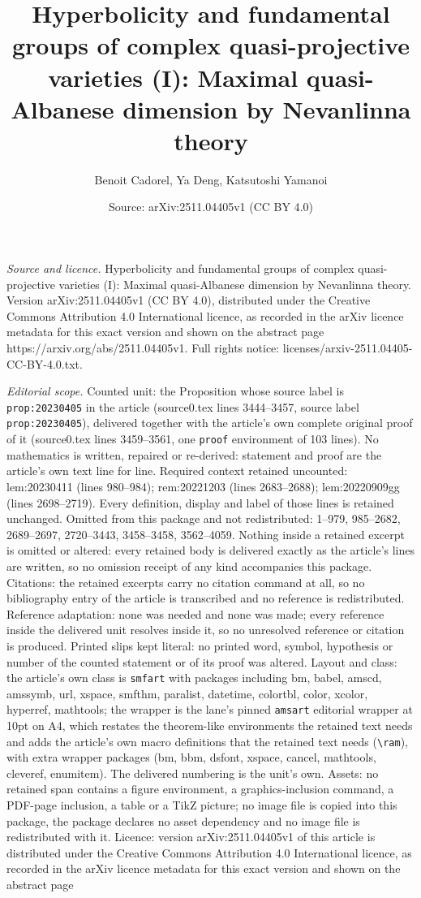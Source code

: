 \documentclass[10pt,a4paper]{amsart}
\title[Hyperbolicity and fundamental groups of complex quasi-projec]{Hyperbolicity and fundamental groups of complex quasi-projective varieties (I): Maximal quasi-Albanese dimension by Nevanlinna theory}
\author{Benoit Cadorel, Ya Deng, Katsutoshi Yamanoi}
\date{Source: arXiv:2511.04405v1 (CC BY 4.0)}
\begin{document}
\maketitle

\noindent\emph{Source and licence.} Hyperbolicity and fundamental groups of complex quasi-projective varieties (I): Maximal quasi-Albanese dimension by Nevanlinna theory. Version arXiv:2511.04405v1 (CC BY 4.0), distributed under the Creative Commons Attribution 4.0 International licence, as recorded in the arXiv licence metadata for this exact version and shown on the abstract page https://arxiv.org/abs/2511.04405v1. Full rights notice: licenses/arxiv-2511.04405-CC-BY-4.0.txt.\par\smallskip

\noindent\textit{Editorial scope.} Counted unit: the Proposition whose source label is \texttt{prop:20230405} in the article (source0.tex lines 3444--3457, source label \texttt{prop:20230405}), delivered together with the article's own complete original proof of it (source0.tex lines 3459--3561, one \texttt{proof} environment of 103 lines). No mathematics is written, repaired or re-derived: statement and proof are the article's own text line for line. Required context retained uncounted: lem:20230411 (lines 980--984); rem:20221203 (lines 2683--2688); lem:20220909gg (lines 2698--2719). Every definition, display and label of those lines is retained unchanged. Omitted from this package and not redistributed: 1--979, 985--2682, 2689--2697, 2720--3443, 3458--3458, 3562--4059. Nothing inside a retained excerpt is omitted or altered: every retained body is delivered exactly as the article's lines are written, so no omission receipt of any kind accompanies this package. Citations: the retained excerpts carry no citation command at all, so no bibliography entry of the article is transcribed and no reference is redistributed. Reference adaptation: none was needed and none was made; every reference inside the delivered unit resolves inside it, so no unresolved reference or citation is produced. Printed slips kept literal: no printed word, symbol, hypothesis or number of the counted statement or of its proof was altered. Layout and class: the article's own class is \texttt{smfart} with packages including bm, babel, amscd, amssymb, url, xspace, smfthm, paralist, datetime, colortbl, color, xcolor, hyperref, mathtools; the wrapper is the lane's pinned \texttt{amsart} editorial wrapper at 10pt on A4, which restates the theorem-like environments the retained text needs and adds the article's own macro definitions that the retained text needs (\texttt{\textbackslash ram}), with extra wrapper packages (bm, bbm, dsfont, xspace, cancel, mathtools, cleveref, enumitem). The delivered numbering is the unit's own. Assets: no retained span contains a figure environment, a graphics-inclusion command, a PDF-page inclusion, a table or a TikZ picture; no image file is copied into this package, the package declares no asset dependency and no image file is redistributed with it. Licence: version arXiv:2511.04405v1 of this article is distributed under the Creative Commons Attribution 4.0 International licence, as recorded in the arXiv licence metadata for this exact version and shown on the abstract page 
\end{document}

